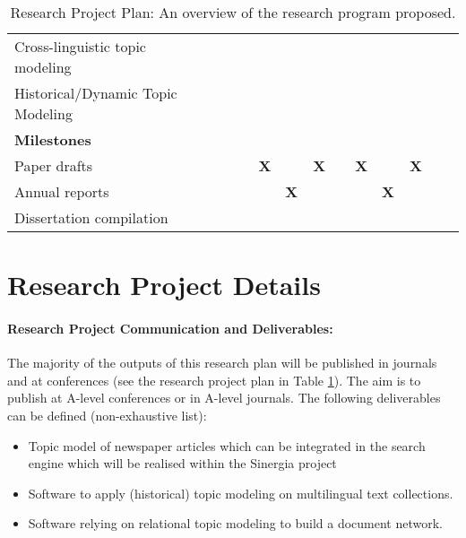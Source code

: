 \begin{table}
{\begin{tabular}{l|llcllllcllllcll|}
Cross-linguistic topic modeling &  & \multicolumn{2}{l}{} &  &  &  & \multicolumn{2}{l}{} &  &  & \cellcolor[HTML]{34FF34} & \multicolumn{2}{l}{\cellcolor[HTML]{34FF34}} & \cellcolor[HTML]{34FF34} &  \\
Historical/Dynamic Topic Modeling & & & & & \cellcolor[HTML]{34FF34} &\cellcolor[HTML]{34FF34} &\cellcolor[HTML]{34FF34} &\cellcolor[HTML]{34FF34} &\cellcolor[HTML]{34FF34} &\cellcolor[HTML]{34FF34} &\cellcolor[HTML]{34FF34} &\cellcolor[HTML]{34FF34} &\cellcolor[HTML]{34FF34} & \\
\textbf{Milestones} &  & \multicolumn{2}{l}{} &  &  &  & \multicolumn{2}{l}{} &  &  &  & \multicolumn{2}{l}{} &  &  \\
Paper drafts &  & \multicolumn{2}{c}{} & \multicolumn{1}{c}{\textbf{}} & \multicolumn{1}{c}{\textbf{X}} & \multicolumn{1}{c}{\textbf{}} & \multicolumn{2}{c}{\textbf{X}} & \multicolumn{1}{c}{\textbf{}} & \multicolumn{1}{c}{\textbf{X}} & \multicolumn{1}{c}{\textbf{}} & \multicolumn{2}{c}{\textbf{X}} & \multicolumn{1}{c}{\textbf{}} & \multicolumn{1}{c|}{} \\
Annual reports &  & \multicolumn{2}{l}{} &  &  & \textbf{X} & \multicolumn{2}{l}{} &  &  & \textbf{X} & \multicolumn{2}{l}{} &  &  \\
Dissertation compilation &  & \multicolumn{2}{l}{} &  &  &  & \multicolumn{2}{l}{} &  &  &  & \multicolumn{2}{l}{} & \cellcolor[HTML]{FE0000} & \cellcolor[HTML]{FE0000} \\ \cline{2-16} 
\end{tabular}%
}
\caption{Research Project Plan: An overview of the research program proposed.}
\label{researchplan}
\end{table}

\section{Research Project Details}

\paragraph{Research Project Communication and Deliverables:}
The majority of the outputs of this research plan will be published in journals and at conferences (see the research project plan in Table \ref{researchplan}). The aim is to publish at A-level conferences or in A-level journals. The following deliverables can be defined (non-exhaustive list):

\begin{itemize}
	\item Topic model of newspaper articles which can be integrated in the search engine which will be realised within the Sinergia project
	\item Software to apply (historical) topic modeling on multilingual text collections.
	\item Software relying on relational topic modeling to build a document network.
\end{itemize}

